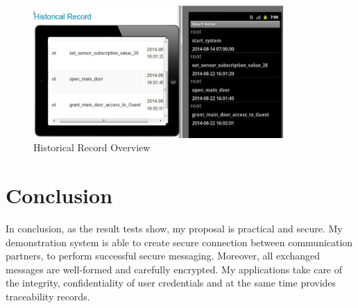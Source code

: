 \begin{figure}[!htb]
	\centering
	\includegraphics[width=0.85\textwidth]{Images/impl/record-query.jpg}
		\caption{Historical Record Overview}
	\label{fig:record-query}
\end{figure}

\section{Conclusion}
In conclusion, as the result tests show, my proposal is practical and secure. My demonstration system is able to create secure connection between communication partners, to perform successful secure messaging. Moreover, all exchanged messages are well-formed and carefully encrypted. My applications take care of the integrity, confidentiality of user credentials and at the same time provides traceability records.